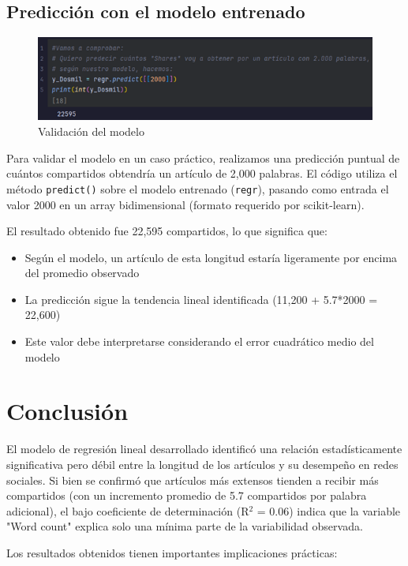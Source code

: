 \documentclass[12pt, a4paper]{article}
\begin{document}
\subsection{Predicción con el modelo entrenado}

\begin{figure}[H]
    \centering
    \includegraphics[width=1.0\textwidth]{Actividad-9/Imagen13.png}
    \caption{Validación del modelo}
\end{figure}

Para validar el modelo en un caso práctico, realizamos una predicción puntual de cuántos compartidos obtendría un artículo de 2,000 palabras. El código utiliza el método \texttt{predict()} sobre el modelo entrenado (\texttt{regr}), pasando como entrada el valor 2000 en un array bidimensional (formato requerido por scikit-learn).

El resultado obtenido fue 22,595 compartidos, lo que significa que:
\begin{itemize}
    \item Según el modelo, un artículo de esta longitud estaría ligeramente por encima del promedio observado
    \item La predicción sigue la tendencia lineal identificada (11,200 + 5.7*2000 = 22,600)
    \item Este valor debe interpretarse considerando el error cuadrático medio del modelo
\end{itemize}

\section{Conclusión}
El modelo de regresión lineal desarrollado identificó una relación estadísticamente significativa pero débil entre la longitud de los artículos y su desempeño en redes sociales. Si bien se confirmó que artículos más extensos tienden a recibir más compartidos (con un incremento promedio de 5.7 compartidos por palabra adicional), el bajo coeficiente de determinación (R$^2$ = 0.06) indica que la variable "Word count" explica solo una mínima parte de la variabilidad observada.

Los resultados obtenidos tienen importantes implicaciones prácticas:
\end{document}
